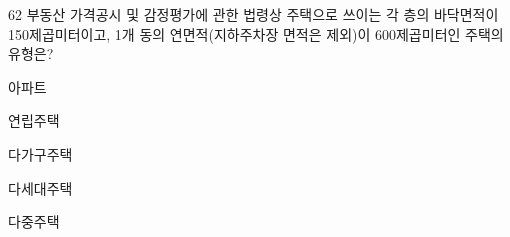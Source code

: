 \begin{question}{62}
부동산 가격공시 및 감정평가에 관한 법령상 주택으로 쓰이는 각 층의 바닥면적이 150제곱미터이고, 1개 동의 연면적(지하주차장 면적은 제외)이 600제곱미터인 주택의 유형은?
\begin{choices}
  \item 아파트
  \item 연립주택
  \item 다가구주택
  \item 다세대주택
  \item 다중주택
\end{choices}
\end{question}
